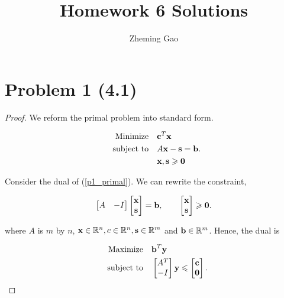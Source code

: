 \documentclass[12pt]{article}
\begin{document}
 
 
\title{Homework 6 Solutions}
\author{Zheming Gao}
\maketitle

\section*{Problem 1 (4.1)}

\begin{proof}

We reform the primal problem into standard form.

\begin{equation}\label{p1_primal}
\begin{aligned}
 \quad \text{Minimize} \quad & \textbf c^T\textbf x\\
\text{subject\  to} \quad & A\textbf x - \textbf s = \textbf b. \\
& \textbf x, \textbf s\geqslant \textbf 0
\end{aligned}
\end{equation}

Consider the dual of (\ref{p1_primal}). We can rewrite the constraint,

$$
\begin{bmatrix}
A & -I
\end{bmatrix}
\begin{bmatrix}
\textbf x \\ \textbf s
\end{bmatrix} = \textbf b, \qquad \begin{bmatrix}
\textbf x \\ \textbf s 
\end{bmatrix}\geqslant \textbf 0.
$$

where $A$ is $m$ by $n$, $\textbf x \in\mathbb R^n, c\in\mathbb R^n, \textbf s\in \mathbb R^m$ and $\textbf b\in \mathbb R^m$.
Hence, the dual is 

\begin{equation}\label{p1_dual}
\begin{aligned}
 \quad \text{Maximize} \quad & \textbf b^T\textbf y\\
\text{subject\  to} \quad & \begin{bmatrix}
A^T \\ -I
\end{bmatrix} \textbf y \leqslant \begin{bmatrix}
\textbf{c} \\ \textbf 0
\end{bmatrix}.
\end{aligned}
\end{equation}


\end{proof}
\end{document}
